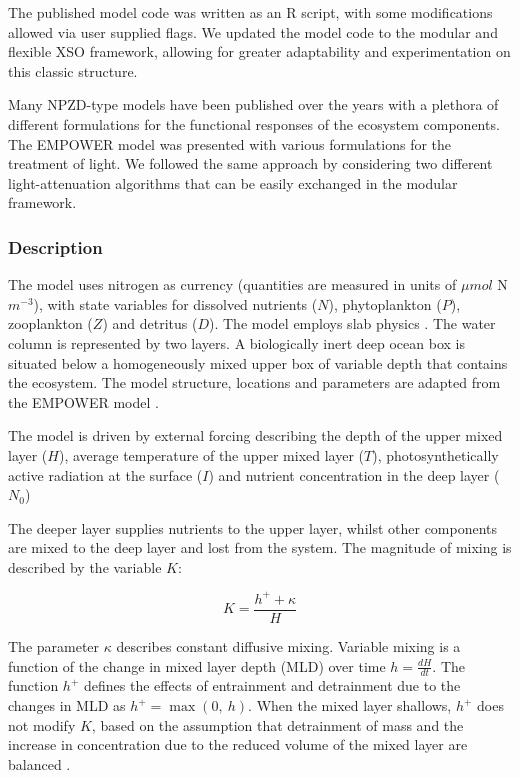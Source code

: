 \documentclass[journal abbreviation, manuscript]{copernicus}
\begin{document}
The published model code was written as an R script, with some modifications allowed via user supplied flags. We updated the model code to the modular and flexible XSO framework, allowing for greater adaptability and experimentation on this classic structure.

Many NPZD-type models have been published over the years with a plethora of different formulations for the functional responses of the ecosystem components. The EMPOWER model was presented with various formulations for the treatment of light. We followed the same approach by considering two different light-attenuation algorithms that can be easily exchanged in the modular framework.

\subsubsection{Description}
The model uses nitrogen as currency (quantities are measured in units of $\mu mol$ N $m^{-3}$), with state variables for dissolved nutrients ($N$), phytoplankton ($P$), zooplankton ($Z$) and detritus ($D$). The model employs slab physics \citep{Evans1985ACycles}. The water column is represented by  two layers. A biologically inert deep ocean box is situated below a homogeneously mixed upper box of variable depth that contains the ecosystem. The model structure, locations and parameters are adapted from the EMPOWER model \citep{Anderson2015c}.

The model is driven by external forcing describing the depth of the upper mixed layer ($H$), average temperature of the upper mixed layer ($T$), photosynthetically active radiation at the surface ($I$) and nutrient concentration in the deep layer ($N_0$) 

The deeper layer supplies nutrients to the upper layer, whilst other components are mixed to the deep layer and lost from the system.
The magnitude of mixing is described by the variable $K$:

\begin{equation}
    K = \frac{h^{+} + \kappa}{H}
\end{equation}

The parameter $\kappa$ describes constant diffusive mixing. Variable mixing is a function of the change in mixed layer depth (MLD) over time $h = \frac{dH}{dt}$. The function $h^{+}$ defines the effects of entrainment and detrainment due to the changes in MLD as $h^{+} = \max(0, \ h)$. When the mixed layer shallows, $h^{+}$ does not modify $K$, based on the assumption that detrainment of mass and the increase in concentration due to the reduced volume of the mixed layer are balanced \citep{Evans1985ACycles}. 
\end{document}
